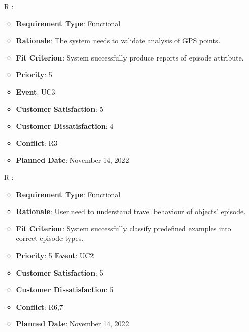 \documentclass[12pt, titlepage]{article}
\newcounter{reqnum} %
\begin{document}
\begin{itemize}
\item[R\refstepcounter{reqnum}\thereqnum
\label{R_Inputs_1}:] 
\begin{itemize}
    \item \textbf{Requirement Type}: Functional
    \item \textbf{Rationale}: The system needs to validate  analysis of GPS points.
    \item \textbf{Fit Criterion}: System successfully produce reports of episode attribute.
    \item \textbf{Priority}: 5
    \item \textbf{Event}: UC3
    \item \textbf{Customer Satisfaction}: 5
    \item \textbf{Customer Dissatisfaction}: 4
    \item \textbf{Conflict}: R3
    \item \textbf{Planned Date}: November 14, 2022
\end{itemize}

\item[R\refstepcounter{reqnum}\thereqnum
\label{R_Inputs_1}:] 
\begin{itemize}
    \item \textbf{Requirement Type}: Functional
    \item \textbf{Rationale}: User need to understand travel behaviour of objects' episode.  
    \item \textbf{Fit Criterion}: System successfully classify predefined examples into correct episode types. 
    \item \textbf{Priority}: 5
    \textbf{Event}: UC2
    \item \textbf{Customer Satisfaction}: 5
    \item \textbf{Customer Dissatisfaction}: 5
    \item \textbf{Conflict}: R6,7
    \item \textbf{Planned Date}: November 14, 2022
\end{itemize}


\end{itemize}
\end{document}
